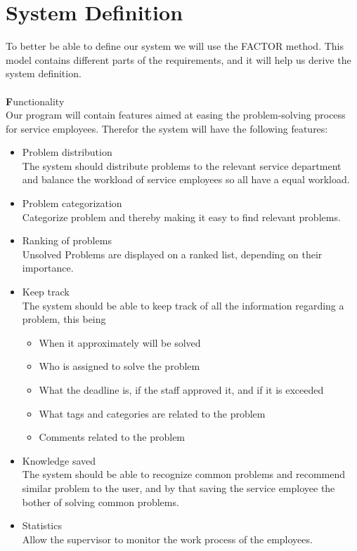 \section{System Definition}
\label{sec:factor}
\label{sec:systemdefinition}
To better be able to define our system we will use the FACTOR method\cite[p.~39]{roedeaalborg}. This model contains different parts of the requirements, and it will help us derive the system definition.  \\
\ \\
{\Large \textbf{F}}unctionality \\
Our program will contain features aimed at easing the problem-solving process for service employees. Therefor the system will have the following features:
\begin{itemize}
\item Problem distribution\\
The system should distribute problems to the relevant service department and balance the workload of service employees so all have a equal workload. 
\item Problem categorization \\
Categorize problem and thereby making it easy to find relevant problems.
\item Ranking of problems \\
Unsolved Problems are displayed on a ranked list, depending on their importance.
\item Keep track \\
The system should be able to keep track of all the information regarding a problem, this being
\begin{itemize}
	\item When it approximately will be solved
	\item Who is assigned to solve the problem
	\item What the deadline is, if the staff approved it, and if it is exceeded
	\item What tags and categories are related to the problem 
	\item Comments related to the problem
\end{itemize}
\item Knowledge saved \\
The system should be able to recognize common problems and recommend similar problem to the user, and by that saving the service employee the bother of solving common problems. 
\item Statistics \\
Allow the supervisor to monitor the work process of the employees.
\end{itemize}
